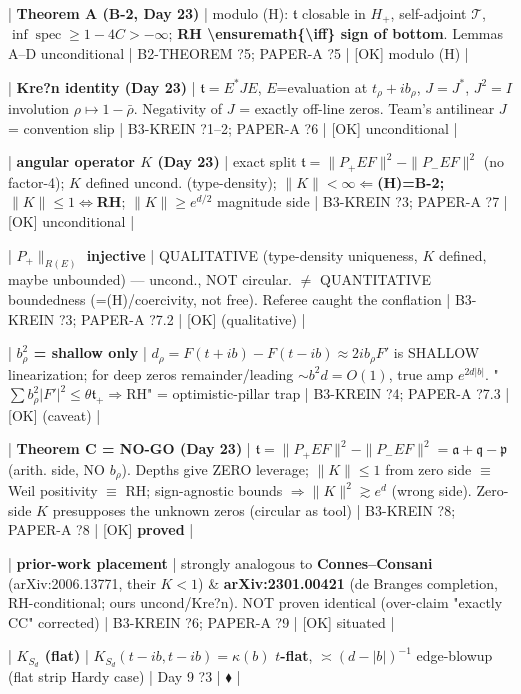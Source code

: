 \documentclass[10pt]{article}
\begin{document}
| \textbf{Theorem A (B-2, Day 23)} | modulo (H): $\mathfrak t$ closable in $H_+$, self-adjoint $\mathcal T$, $\inf\operatorname{spec}\ge1-4C>-\infty$; \textbf{RH \textbackslash{}ensuremath\{\textbackslash{}iff\} sign of bottom}. Lemmas A--D unconditional | B2-THEOREM ?5; PAPER-A ?5 | [OK] modulo (H) |\par
| \textbf{Kre?n identity (Day 23)} | $\mathfrak t=E^*JE$, $E$=evaluation at $t_\rho+ib_\rho$, $J=J^*$, $J^2=I$ involution $\rho\mapsto1-\bar\rho$. Negativity of $J$ = exactly off-line zeros. Team's antilinear $J$ = convention slip | B3-KREIN ?1--2; PAPER-A ?6 | [OK] unconditional |\par
| \textbf{angular operator $K$ (Day 23)} | exact split $\mathfrak t=\|P_+EF\|^2-\|P_-EF\|^2$ (no factor-4); $K$ defined uncond. (type-density); \textbf{$\|K\|<\infty\Leftarrow$(H)=B-2; $\|K\|\le1\iff$RH}; $\|K\|\ge e^{d/2}$ magnitude side | B3-KREIN ?3; PAPER-A ?7 | [OK] unconditional |\par
| \textbf{$P_+\|_{R(E)}$ injective} | QUALITATIVE (type-density uniqueness, $K$ defined, maybe unbounded) --- uncond., NOT circular. \ensuremath{\ne} QUANTITATIVE boundedness (=(H)/coercivity, not free). Referee caught the conflation | B3-KREIN ?3; PAPER-A ?7.2 | [OK] (qualitative) |\par
| \textbf{$b_\rho^2$ = shallow only} | $d_\rho=F(t+ib)-F(t-ib)\approx2ib_\rho F'$ is SHALLOW linearization; for deep zeros remainder/leading $\sim b^2 d=O(1)$, true amp $e^{2d|b|}$. "$\sum b_\rho^2|F'|^2\le\theta\mathfrak t_+\Rightarrow$RH" = optimistic-pillar trap | B3-KREIN ?4; PAPER-A ?7.3 | [OK] (caveat) |\par
| \textbf{Theorem C = NO-GO (Day 23)} | $\mathfrak t=\|P_+EF\|^2-\|P_-EF\|^2=\mathfrak a+\mathfrak q-\mathfrak p$ (arith. side, NO $b_\rho$). Depths give ZERO leverage; $\|K\|\le1$ from zero side $\equiv$ Weil positivity $\equiv$ RH; sign-agnostic bounds $\Rightarrow\|K\|^2\gtrsim e^d$ (wrong side). Zero-side $K$ presupposes the unknown zeros (circular as tool) | B3-KREIN ?8; PAPER-A ?8 | [OK] \textbf{proved} |\par
| \textbf{prior-work placement} | strongly analogous to \textbf{Connes--Consani} (arXiv:2006.13771, their $K<1$) \& \textbf{arXiv:2301.00421} (de Branges completion, RH-conditional; ours uncond/Kre?n). NOT proven identical (over-claim "exactly CC" corrected) | B3-KREIN ?6; PAPER-A ?9 | [OK] situated |\par
| \textbf{$K_{S_d}$ (flat)} | $K_{S_d}(t-ib,t-ib)=\kappa(b)$ \textbf{$t$-flat}, $\asymp(d-|b|)^{-1}$ edge-blowup (flat strip Hardy case) | Day 9 ?3 | $\blacklozenge$ |\par
\end{document}
